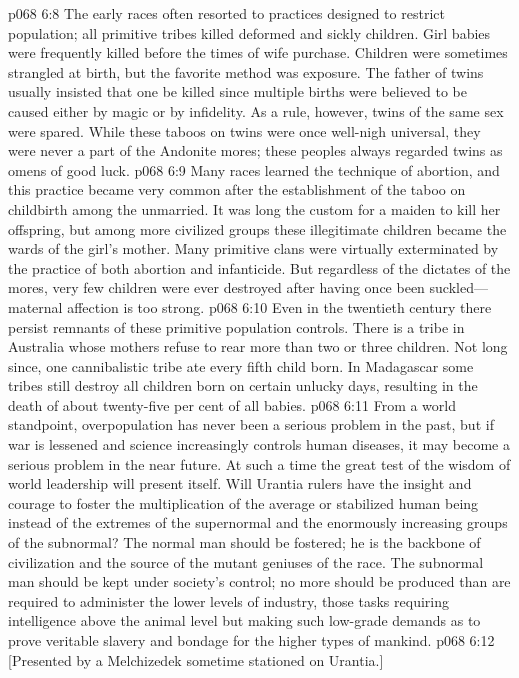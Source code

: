\vs p068 6:8 The early races often resorted to practices designed to restrict population; all primitive tribes killed deformed and sickly children. Girl babies were frequently killed before the times of wife purchase. Children were sometimes strangled at birth, but the favorite method was exposure. The father of twins usually insisted that one be killed since multiple births were believed to be caused either by magic or by infidelity. As a rule, however, twins of the same sex were spared. While these taboos on twins were once well\hyp{}nigh universal, they were never a part of the Andonite mores; these peoples always regarded twins as omens of good luck.\plusone
\vs p068 6:9 Many races learned the technique of abortion, and this practice became very common after the establishment of the taboo on childbirth among the unmarried. It was long the custom for a maiden to kill her offspring, but among more civilized groups these illegitimate children became the wards of the girl’s mother. Many primitive clans were virtually exterminated by the practice of both abortion and infanticide. But regardless of the dictates of the mores, very few children were ever destroyed after having once been suckled---maternal affection is too strong.\plusone
\vs p068 6:10 Even in the twentieth century there persist remnants of these primitive population controls. There is a tribe in Australia whose mothers refuse to rear more than two or three children. Not long since, one cannibalistic tribe ate every fifth child born. In Madagascar some tribes still destroy all children born on certain unlucky days, resulting in the death of about twenty\hyp{}five per cent of all babies.\plusone
\pc \vs p068 6:11 From a world standpoint, overpopulation has never been a serious problem in the past, but if war is lessened and science increasingly controls human diseases, it may become a serious problem in the near future. At such a time the great test of the wisdom of world leadership will present itself. Will Urantia rulers have the insight and courage to foster the multiplication of the average or stabilized human being instead of the extremes of the supernormal and the enormously increasing groups of the subnormal? The normal man should be fostered; he is the backbone of civilization and the source of the mutant geniuses of the race. The subnormal man should be kept under society’s control; no more should be produced than are required to administer the lower levels of industry, those tasks requiring intelligence above the animal level but making such low\hyp{}grade demands as to prove veritable slavery and bondage for the higher types of mankind.
\vsetoff
\vs p068 6:12 [Presented by a Melchizedek sometime stationed on Urantia.]
